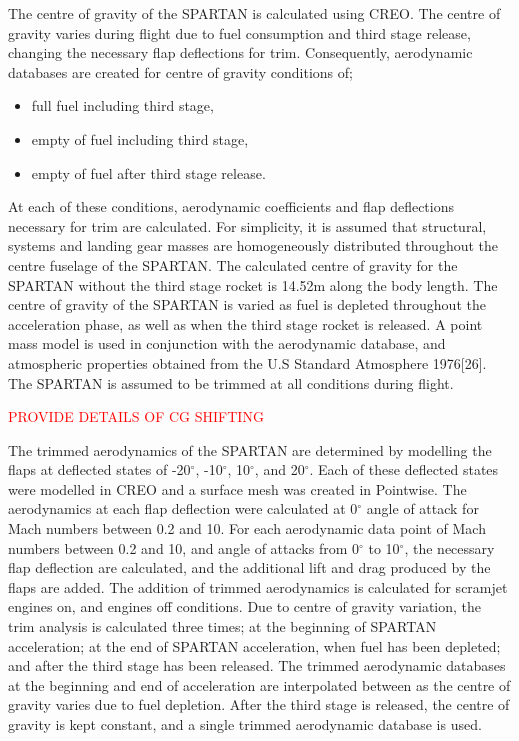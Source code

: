 		The centre of gravity of the SPARTAN is calculated using CREO. The centre of gravity varies during flight due to fuel consumption and third stage release, changing the necessary flap deflections for trim. Consequently, aerodynamic databases are created for centre of gravity conditions of; 
		\begin{itemize}
			\item full fuel including third stage,
			\item empty of fuel including third stage,
			\item empty of fuel after third stage release.
		\end{itemize}
		At each of these conditions, aerodynamic coefficients and flap deflections necessary for trim are calculated.  For simplicity, it is assumed that structural, systems and landing gear masses are homogeneously distributed throughout the centre fuselage of the SPARTAN. The calculated centre of gravity for the SPARTAN without the third stage rocket is 14.52m along the body length. 
		The centre of gravity of the SPARTAN is varied as fuel is depleted throughout the acceleration phase, as well as when the third stage rocket is released. A point mass model is used in conjunction with the aerodynamic database,
		and atmospheric properties obtained from the U.S Standard Atmosphere 1976[26]. The SPARTAN is assumed to be
		trimmed at all conditions during flight.
		
		\textcolor{red}{PROVIDE DETAILS OF CG SHIFTING}
		
		
		
		The trimmed aerodynamics of the SPARTAN are determined by modelling the flaps at deflected states of -20$^\circ$, -10$^\circ$, 10$^\circ$, and 20$^\circ$. Each of these deflected states were modelled in CREO and a surface mesh was created in Pointwise. The aerodynamics at each flap deflection were calculated at 0$^\circ$ angle of attack for Mach numbers between 0.2 and 10. For each aerodynamic data point of Mach numbers between 0.2 and 10, and angle of attacks from 0$^\circ$ to 10$^\circ$, the necessary flap deflection are calculated, and the additional lift and drag produced by the flaps are added. The addition of trimmed aerodynamics is calculated for scramjet engines on, and engines off conditions. Due to centre of gravity variation, the trim analysis is calculated three times; at the beginning of SPARTAN acceleration; at the end of SPARTAN acceleration, when fuel has been depleted; and after the third stage has been released. The trimmed aerodynamic databases at the beginning and end of acceleration are interpolated between as the centre of gravity varies due to fuel depletion. After the third stage is released, the centre of gravity is kept constant, and a single trimmed aerodynamic database is used. 
		
